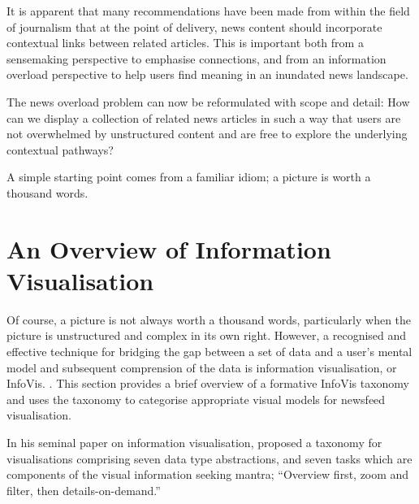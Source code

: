 It is apparent that many recommendations have been made from within the field of journalism that at the point of delivery, news content should incorporate contextual links between related articles. This is important both from a sensemaking perspective to emphasise connections, and from an information overload perspective to help users find meaning in an inundated news landscape.

The news overload problem can now be reformulated with scope and detail: How can we display a collection of related news articles in such a way that users are not overwhelmed by unstructured content and are free to explore the underlying contextual pathways?

A simple starting point comes from a familiar idiom; a picture is worth a thousand words.

\section{An Overview of Information Visualisation}

Of course, a picture is not always worth a thousand words, particularly when the picture is unstructured and complex in its own right. However, a recognised and effective technique for bridging the gap between a set of data and a user's mental model and subsequent comprension of the data is information visualisation, or InfoVis. \citep{UnderstandingAndCharacterizingInsights, ThemeRiver}. This section provides a brief overview of a formative InfoVis taxonomy and uses the taxonomy to categorise appropriate visual models for newsfeed visualisation.

In his seminal paper on information visualisation, \citeauthor{TheEyesHaveIt} proposed a taxonomy for visualisations comprising seven data type abstractions, and seven tasks which are components of the visual information seeking mantra; ``Overview first, zoom and filter, then details-on-demand.'' \citep[p.1]{TheEyesHaveIt}

